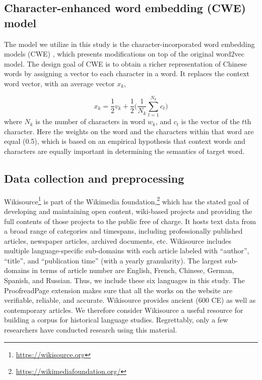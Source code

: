 \documentclass[output=paper]{langsci/langscibook}
\begin{document}
\subsection{Character-enhanced word embedding (CWE) model}
The model we utilize in this study is the character-incorporated word embedding models (CWE) \citep{chen2015joint}, which presents modifications on top of the original word2vec model. The design goal of CWE is to obtain a richer representation of Chinese words by assigning a vector to each character in a word. It replaces the context word vector, with an average vector $x_k$, 

\begin{equation}\label{eq:CWE_avgvec}
    x_k = \frac{1}{2}v_k + \frac{1}{2}\Big(\frac{1}{N_k}\sum^{N_k}_{t=1}{c_t}\Big)
\end{equation}
\noindent where $N_k$ is the number of characters in word $w_k$, and $c_t$ is the vector of the $t$th character. Here the weights on the word and the characters within that word are equal (0.5), which is based on an empirical hypothesis that context words and characters are equally important in determining the semantics of target word.


\subsection{Data collection and preprocessing}

Wikisource\footnote{\url{https://wikisource.org}} is part of the Wikimedia foundation,\footnote{\url{https://wikimediafoundation.org/}} which has the stated goal of developing and maintaining open content, wiki-based projects and providing the full contents of those projects to the public free of charge. 
It hosts text data from a broad range of categories and timespans, including professionally published articles, newspaper articles, archived documents, etc.
Wikisource includes multiple language-specific sub-domains with each article labeled with ``author'', ``title'', and ``publication time'' (with a yearly granularity). The largest sub-domains in terms of article number are English, French, Chinese, German, Spanish, and Russian. 
Thus, we include these six languages in this study.
The ProofreadPage extension makes sure that all the works on the website are verifiable, reliable, and accurate. 
Wikisource provides ancient (600 CE) as well as contemporary articles.
We therefore consider Wikisource a useful resource for building a corpus for historical language studies. Regrettably, only a few researchers have conducted research using this material. 
\end{document}
